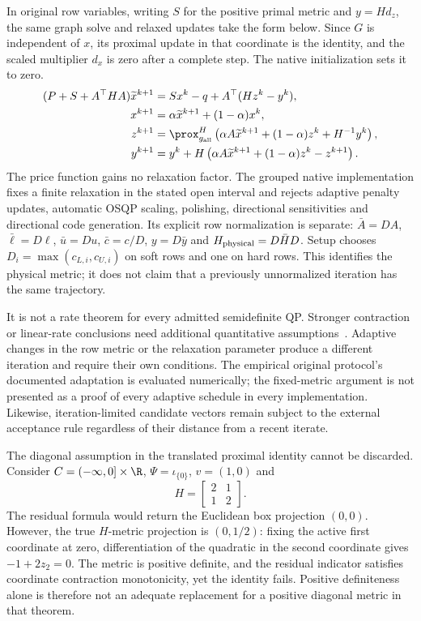 In original row variables, writing $S$ for the positive primal metric
and $y=Hd_z$, the same graph solve and relaxed updates take the form
below. Since $G$ is independent of $x$, its proximal update in that
coordinate is the identity, and the scaled multiplier $d_x$ is zero
after a complete step. The native initialization sets it to zero.
\begin{align}\label{eq:paper-native-updates}
 (P+S+A^\top HA)\widetilde x^{k+1}
   &=Sx^k-q+A^\top(Hz^k-y^k),\\
 x^{k+1}&=\alpha\widetilde x^{k+1}+(1-\alpha)x^k,\nonumber\\
 z^{k+1}&=\prox_{g_{\mathrm{all}}}^H\left(\alpha A\widetilde x^{k+1}
                       +(1-\alpha)z^k+H^{-1}y^k\right),\nonumber\\
 y^{k+1}&=y^k+H\left(\alpha A\widetilde x^{k+1}
                       +(1-\alpha)z^k-z^{k+1}\right).\nonumber
\end{align}
The price function gains no relaxation factor. The grouped native
implementation fixes a finite relaxation in the stated open interval
and rejects adaptive penalty updates, automatic OSQP scaling, polishing,
directional sensitivities and directional code generation. Its explicit
row normalization is separate: $\bar A=DA$, $\bar\ell=D\ell$,
$\bar u=Du$, $\bar c=c/D$, $y=D\bar y$ and
$H_{\rm physical}=D\bar H D$. Setup chooses
$D_i=\max(c_{L,i},c_{U,i})$ on soft rows and one on hard rows.
This identifies the physical metric; it does not claim that a
previously unnormalized iteration has the same trajectory.

It is not a rate theorem for every admitted semidefinite QP. Stronger
contraction or linear-rate conclusions need additional quantitative
assumptions~\cite{giselsson}. Adaptive changes in the row metric or the
relaxation parameter produce a different iteration and require their
own conditions. The empirical original protocol's documented adaptation
is evaluated numerically; the fixed-metric argument is not presented
as a proof of every adaptive schedule in every implementation. Likewise,
iteration-limited candidate vectors remain subject to the external
acceptance rule regardless of their distance from a recent iterate.

The diagonal assumption in the translated proximal identity cannot be
discarded. Consider $C=(-\infty,0]\times\R$, $\Psi=\iota_{\{0\}}$,
$v=(1,0)$ and
\begin{equation}\label{eq:paper-dense-counterexample}
 H=\begin{bmatrix}2&1\\1&2\end{bmatrix}.
\end{equation}
The residual formula would return the Euclidean box projection $(0,0)$.
However, the true $H$-metric projection is $(0,1/2)$: fixing the active
first coordinate at zero, differentiation of the quadratic in the
second coordinate gives $-1+2z_2=0$. The metric is positive definite,
and the residual indicator satisfies coordinate contraction monotonicity,
yet the identity fails. Positive definiteness alone is therefore not
an adequate replacement for a positive diagonal metric in that theorem.


